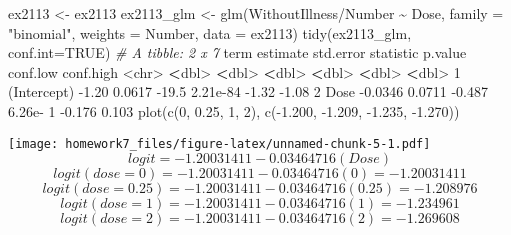 \documentclass[
]{article}
\newenvironment{Shaded}{\begin{snugshade}}{\end{snugshade}}
\newcommand{\AttributeTok}[1]{\textcolor[rgb]{0.77,0.63,0.00}{#1}}
\newcommand{\CommentTok}[1]{\textcolor[rgb]{0.56,0.35,0.01}{\textit{#1}}}
\newcommand{\ConstantTok}[1]{\textcolor[rgb]{0.00,0.00,0.00}{#1}}
\newcommand{\DecValTok}[1]{\textcolor[rgb]{0.00,0.00,0.81}{#1}}
\newcommand{\ErrorTok}[1]{\textcolor[rgb]{0.64,0.00,0.00}{\textbf{#1}}}
\newcommand{\FloatTok}[1]{\textcolor[rgb]{0.00,0.00,0.81}{#1}}
\newcommand{\FunctionTok}[1]{\textcolor[rgb]{0.00,0.00,0.00}{#1}}
\newcommand{\NormalTok}[1]{#1}
\newcommand{\OtherTok}[1]{\textcolor[rgb]{0.56,0.35,0.01}{#1}}
\newcommand{\SpecialCharTok}[1]{\textcolor[rgb]{0.00,0.00,0.00}{#1}}
\newcommand{\StringTok}[1]{\textcolor[rgb]{0.31,0.60,0.02}{#1}}
\begin{document}
\begin{Shaded}
\begin{Highlighting}[]
\NormalTok{ex2113 }\OtherTok{\textless{}{-}}\NormalTok{ ex2113}
\NormalTok{ex2113\_glm }\OtherTok{\textless{}{-}} \FunctionTok{glm}\NormalTok{(WithoutIllness}\SpecialCharTok{/}\NormalTok{Number }\SpecialCharTok{\textasciitilde{}}\NormalTok{ Dose, }\AttributeTok{family =} \StringTok{"binomial"}\NormalTok{, }\AttributeTok{weights =}\NormalTok{ Number, }\AttributeTok{data =}\NormalTok{ ex2113)}
\FunctionTok{tidy}\NormalTok{(ex2113\_glm, }\AttributeTok{conf.int=}\ConstantTok{TRUE}\NormalTok{)}
\CommentTok{\# A tibble: 2 x 7}
\NormalTok{  term        estimate std.error statistic  p.value conf.low conf.high}
  \SpecialCharTok{\textless{}}\NormalTok{chr}\SpecialCharTok{\textgreater{}}          \ErrorTok{\textless{}}\NormalTok{dbl}\SpecialCharTok{\textgreater{}}     \ErrorTok{\textless{}}\NormalTok{dbl}\SpecialCharTok{\textgreater{}}     \ErrorTok{\textless{}}\NormalTok{dbl}\SpecialCharTok{\textgreater{}}    \ErrorTok{\textless{}}\NormalTok{dbl}\SpecialCharTok{\textgreater{}}    \ErrorTok{\textless{}}\NormalTok{dbl}\SpecialCharTok{\textgreater{}}     \ErrorTok{\textless{}}\NormalTok{dbl}\SpecialCharTok{\textgreater{}}
\DecValTok{1}\NormalTok{ (Intercept)  }\SpecialCharTok{{-}}\FloatTok{1.20}      \FloatTok{0.0617}   \SpecialCharTok{{-}}\FloatTok{19.5}   \FloatTok{2.21e{-}84}   \SpecialCharTok{{-}}\FloatTok{1.32}     \SpecialCharTok{{-}}\FloatTok{1.08} 
\DecValTok{2}\NormalTok{ Dose         }\SpecialCharTok{{-}}\FloatTok{0.0346}    \FloatTok{0.0711}    \SpecialCharTok{{-}}\FloatTok{0.487} \FloatTok{6.26}\NormalTok{e}\SpecialCharTok{{-}} \DecValTok{1}   \SpecialCharTok{{-}}\FloatTok{0.176}     \FloatTok{0.103}
\FunctionTok{plot}\NormalTok{(}\FunctionTok{c}\NormalTok{(}\DecValTok{0}\NormalTok{, }\FloatTok{0.25}\NormalTok{, }\DecValTok{1}\NormalTok{, }\DecValTok{2}\NormalTok{), }\FunctionTok{c}\NormalTok{(}\SpecialCharTok{{-}}\FloatTok{1.200}\NormalTok{, }\SpecialCharTok{{-}}\FloatTok{1.209}\NormalTok{, }\SpecialCharTok{{-}}\FloatTok{1.235}\NormalTok{, }\SpecialCharTok{{-}}\FloatTok{1.270}\NormalTok{))}
\end{Highlighting}
\end{Shaded}

\texttt{[image: homework7\_files/figure-latex/unnamed-chunk-5-1.pdf]}
\[logit = -1.20031411 - 0.03464716(Dose)\]
\[logit(dose = 0) = -1.20031411 - 0.03464716(0) = -1.20031411\]
\[logit(dose = 0.25) = -1.20031411 - 0.03464716(0.25) = -1.208976\]
\[logit(dose = 1) = -1.20031411 - 0.03464716(1) = -1.234961\]
\[logit(dose = 2) = -1.20031411 - 0.03464716(2) = -1.269608\]
\end{document}
